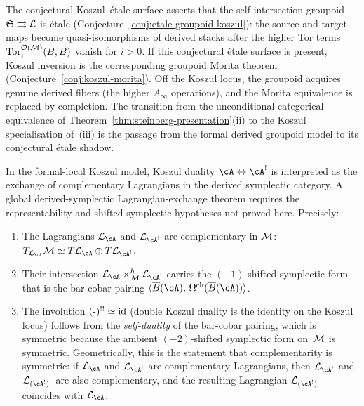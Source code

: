 \begin{remark}
\label{rem:etale-cross-ref}
The conjectural Koszul--\'etale surface asserts that the
self-intersection groupoid $\mathfrak{S} \rightrightarrows \mathcal L$ is
\'etale \textup{(}Conjecture~\textup{\ref{conj:etale-groupoid-koszul}}\textup{)}:
the source and target maps become quasi-isomorphisms of derived stacks
after the higher Tor terms
$\operatorname{Tor}^{\mathcal{O}(\mathcal M)}_i(B,B)$ vanish for $i > 0$.  If this
conjectural \'etale surface is present, Koszul inversion is the
corresponding groupoid Morita theorem
\textup{(}Conjecture~\textup{\ref{conj:koszul-morita}}\textup{)}.
Off the Koszul locus, the groupoid acquires genuine derived
fibers (the higher $A_\infty$ operations), and the Morita
equivalence is replaced by completion. The transition from the
unconditional categorical equivalence of
Theorem~\ref{thm:steinberg-presentation}(ii) to the Koszul
specialisation of~(iii) is the passage from the formal derived
groupoid model to its conjectural \'etale shadow.
\end{remark}

\begin{proposition}
\label{prop:koszul-serre}
In the formal-local Koszul model, Koszul duality
$\cA \leftrightarrow \cA^!$ is interpreted as the exchange of
complementary Lagrangians in the derived symplectic category. A global
derived-symplectic Lagrangian-exchange theorem requires the
representability and shifted-symplectic hypotheses not proved here.
Precisely:
\begin{enumerate}[label=\textup{(\roman*)}]
\item The Lagrangians $\cL_\cA$ and $\cL_{\cA^!}$ are complementary
 in $\mathcal M$: $T_{\cL_\cA}\cM \simeq T\cL_\cA \oplus T\cL_{\cA^!}$.
\item Their intersection $\cL_\cA \times_\cM^h \cL_{\cA^!}$
 carries the $(-1)$-shifted symplectic form that is the bar-cobar
 pairing
 $\langle\barB(\cA),\, \Omegach(\barB(\cA))\rangle$.
\item The involution $(\text{-})^{!!} \simeq \mathrm{id}$
 \textup{(}double Koszul duality is the identity on the Koszul
 locus\textup{)} follows from the \emph{self-duality} of the
 bar-cobar pairing, which is symmetric because the ambient
 $(-2)$-shifted symplectic form on~$\mathcal M$ is symmetric.
 Geometrically, this is the statement that complementarity is
 symmetric: if\/ $\cL_\cA$ and\/ $\cL_{\cA^!}$ are complementary
 Lagrangians, then\/ $\cL_{\cA^!}$ and\/ $\cL_{(\cA^!)^!}$ are
 also complementary, and the resulting Lagrangian\/
 $\cL_{(\cA^!)^!}$ coincides with\/ $\cL_\cA$.
\end{enumerate}
\end{proposition}

